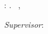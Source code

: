 \thispagestyle{empty}

\hfill

\vfill

\noindent\myName: \swash{\myTitle,} \mySubtitle.
\textcopyright~\myLocation,~\myDate

\medskip
%
\noindent\textit{Supervisor}:~\myProf \\
